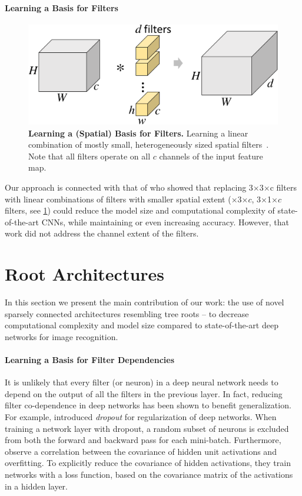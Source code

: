 \documentclass[thesis]{subfiles}
\begin{document}
	\paragraph{Learning a Basis for Filters}
	\begin{figure}[tp]
		\centering
		\includegraphics[width=\linewidth, page=3]{Figs/PDF/sparsification}
		\caption{\textbf{Learning a (Spatial) Basis for Filters.} Learning a linear combination of mostly small, heterogeneously sized spatial filters~\citep{Ioannou2016}. Note that all filters operate on all $c$ channels of the input feature map.}
		\label{fig:spatialbasis}
	\end{figure}
	Our approach is connected with that of \citet{Ioannou2016} who showed that replacing 3$\times$3$\times$c filters with linear combinations of filters with smaller spatial extent ($\times$3$\times c$, 3$\times$1$\times c$ filters, see \cref{fig:spatialbasis}) could reduce the model size and computational complexity of state-of-the-art CNNs, while maintaining or even increasing accuracy. However, that work did not address the channel extent of the filters.
	
	\section{Root Architectures}
	\label{method}
	In this section we present the main contribution of our work: the use of novel sparsely connected architectures resembling tree roots -- to decrease computational complexity and model size compared to state-of-the-art deep networks for image recognition.
	
	\paragraph{Learning a Basis for Filter Dependencies}
	It is unlikely that every filter (or neuron) in a deep neural network needs to depend on the output of all the filters in the previous layer. In fact, reducing filter co-dependence in deep networks has been shown to benefit generalization. For example, \citet{Hinton2012} introduced {\em dropout} for regularization of deep networks. When training a network layer with dropout, a random subset of neurons is excluded from both the forward and backward pass for each mini-batch.  Furthermore, \citet{Cogswell2016} observe a correlation between the covariance of hidden unit activations and overfitting. To explicitly reduce the covariance of hidden activations, they train networks with a loss function, based on the covariance matrix of the activations in a hidden layer. 
	
\end{document}

